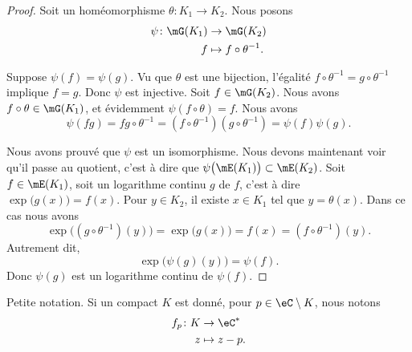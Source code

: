 \begin{proof}
	Soit un homéomorphisme \( \theta\colon K_1\to K_2\). Nous posons
	\begin{equation}
		\begin{aligned}
			\psi\colon \mG(K_1) & \to \mG(K_2)                \\
			f                   & \mapsto f\circ \theta^{-1}.
		\end{aligned}
	\end{equation}
	\begin{subproof}
		\spitem[Injective]
		Suppose \( \psi(f)=\psi(g)\). Vu que \( \theta\) est une bijection, l'égalité \( f\circ \theta^{-1}=g\circ\theta^{-1}\) implique \( f=g\). Donc \( \psi\) est injective.
		\spitem[Surjective]
		Soit \( f\in\mG(K_2)\). Nous avons \( f\circ\theta\in\mG(K_1)\), et évidemment \( \psi(f\circ\theta)=f\).
		\spitem[Morphisme]
		Nous avons
		\begin{equation}
			\psi(fg)=fg\circ\theta^{-1}=(f\circ\theta^{-1})(g\circ\theta^{-1})=\psi(f)\psi(g).
		\end{equation}
	\end{subproof}
	Nous avons prouvé que \( \psi\) est un isomorphisme. Nous devons maintenant voir qu'il passe au quotient, c'est à dire que \( \psi\big( \mE(K_1) \big)\subset\mE(K_2)\). Soit \( f\in\mE(K_1)\), soit un logarithme continu \( g\) de \( f\), c'est à dire \( \exp\big( g(x) \big)=f(x)\). Pour \( y\in K_2\), il existe \( x\in K_1\) tel que \( y=\theta(x)\). Dans ce cas nous avons
	\begin{equation}
		\exp\big( (g\circ\theta^{-1})(y) \big)=\exp\big( g(x) \big)=f(x)=(f\circ\theta^{-1})(y).
	\end{equation}
	Autrement dit,
	\begin{equation}
		\exp\big( \psi(g)(y) \big)=\psi(f).
	\end{equation}
	Donc \( \psi(g)\) est un logarithme continu de \( \psi(f)\).
\end{proof}

\begin{definition}		\label{DEFooKXHUooTsKuOe}
	Petite notation. Si un compact \( K\) est donné, pour \( p\in\eC\setminus K\), nous notons
	\begin{equation}
		\begin{aligned}
			f_p\colon K & \to \eC^*    \\
			z           & \mapsto z-p.
		\end{aligned}
	\end{equation}
\end{definition}

